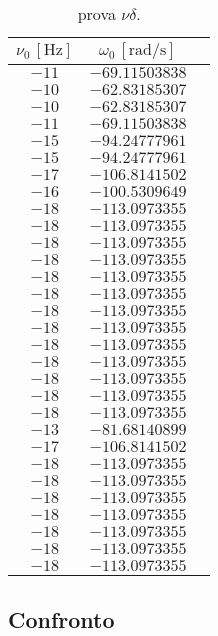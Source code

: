 \documentclass[]{article}
\let\oldsubsection\subsection%
\renewcommand{\subsection}{%
	\renewcommand{\theequation}{\thesubsection.\arabic{equation}}%
	\oldsubsection}%
\begin{document}
    \begin{table}[!h]

        \centering
        \begin{tabular}{||c|c|c||}

            \hline
            $\nu_0 \,[\text{Hz}]$ & $\omega_0 \,[\text{rad/s}]$ \\
            \hline\hline
            $-11$ & $-69.11503838$ \\\hline
            $-10$ & $-62.83185307$ \\\hline
            $-10$ & $-62.83185307$ \\\hline
            $-11$ & $-69.11503838$ \\\hline
            $-15$ & $-94.24777961$ \\\hline
            $-15$ & $-94.24777961$ \\\hline
            $-17$ & $-106.8141502$ \\\hline
            $-16$ & $-100.5309649$ \\\hline
            $-18$ & $-113.0973355$ \\\hline
            $-18$ & $-113.0973355$ \\\hline
            $-18$ & $-113.0973355$ \\\hline
            $-18$ & $-113.0973355$ \\\hline
            $-18$ & $-113.0973355$ \\\hline
            $-18$ & $-113.0973355$ \\\hline
            $-18$ & $-113.0973355$ \\\hline
            $-18$ & $-113.0973355$ \\\hline
            $-18$ & $-113.0973355$ \\\hline
            $-18$ & $-113.0973355$ \\\hline
            $-18$ & $-113.0973355$ \\\hline
            $-18$ & $-113.0973355$ \\\hline
            $-18$ & $-113.0973355$ \\\hline
            $-13$ & $-81.68140899$ \\\hline
            $-17$ & $-106.8141502$ \\\hline
            $-18$ & $-113.0973355$ \\\hline
            $-18$ & $-113.0973355$ \\\hline
            $-18$ & $-113.0973355$ \\\hline
            $-18$ & $-113.0973355$ \\\hline
            $-18$ & $-113.0973355$ \\\hline
            $-18$ & $-113.0973355$ \\\hline
            $-18$ & $-113.0973355$ \\\hline
            
        \end{tabular}
        \caption{prova $\nu\delta$.}

    \end{table}

    \subsection{Confronto}
\end{document}
